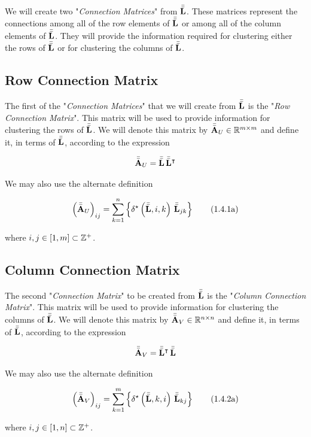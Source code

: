 \documentclass[../ClusteringConnectionsMAIN.tex]{subfiles}
\begin{document}
\begin{flushleft}
\begin{large}


We will create two "\emph{Connection Matrices}" from $\bar{\bar{\mathbf{L}}}$.  These matrices represent the connections among all of the row elements of $\bar{\bar{\mathbf{L}}}$ or among all of the column elements of $\bar{\bar{\mathbf{L}}}$.  They will provide the information required for clustering either the rows of $\bar{\bar{\mathbf{L}}}$ or for clustering the columns of $\bar{\bar{\mathbf{L}}}$.


\subsection{Row Connection Matrix}

The first of the "\emph{Connection Matrices}" that we will create from $\bar{\bar{\mathbf{L}}}$ is the "\emph{Row Connection Matrix}".  This matrix will be used to provide information for clustering the rows of $\bar{\bar{\mathbf{L}}}$.  We will denote this matrix by $\bar{\bar{\mathbf{A}}}_U \in \mathbb{R}^{m \times m}$ and define it, in terms of $\bar{\bar{\mathbf{L}}}$, according to the expression

\begin{align}
\bar{\bar{\mathbf{A}}}_U = \bar{\bar{\mathbf{L}}} \, \bar{\bar{\mathbf{L}}}^\intercal
\end{align}

We may also use the alternate definition 

\begin{align}
\left( \bar{\bar{\mathbf{A}}}_U \right)_{ij} = \sum_{k = 1}^n \left\{ \delta^\star \left( \bar{\bar{\mathbf{L}}}, i, k \right) \, \bar{\bar{\mathbf{L}}}_{jk} \right\} \tag{1.4.1a}
\end{align}

where $i, j \in \left[ 1, m \right] \subset \mathbb{Z}^+$.


\subsection{Column Connection Matrix}

The second "\emph{Connection Matrix}" to be created from $\bar{\bar{\mathbf{L}}}$ is the "\emph{Column Connection Matrix}".  This matrix will be used to provide information for clustering the columns of $\bar{\bar{\mathbf{L}}}$.  We will denote this matrix by $\bar{\bar{\mathbf{A}}}_V \in \mathbb{R}^{n \times n}$ and define it, in terms of $\bar{\bar{\mathbf{L}}}$, according to the expression

\begin{align}
\bar{\bar{\mathbf{A}}}_V = \bar{\bar{\mathbf{L}}}^\intercal \, \bar{\bar{\mathbf{L}}}
\end{align}

We may also use the alternate definition 

\begin{align}
\left( \bar{\bar{\mathbf{A}}}_V \right)_{ij} = \sum_{k = 1}^m \left\{ \delta^\star \left( \bar{\bar{\mathbf{L}}}, k, i \right) \, \bar{\bar{\mathbf{L}}}_{kj} \right\} \tag{1.4.2a}
\end{align}

where $i, j \in \left[ 1, n \right] \subset \mathbb{Z}^+$.


\end{large}
\end{flushleft}
\end{document}
